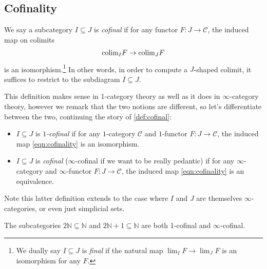 \subsection{Cofinality}
\begin{definition}\label{def:cofinal} 
We say a subcategory $I \subseteq J$ is \textit{cofinal} if for any functor $F \colon J \to \mathscr{C}$, the induced map on colimits
\begin{equation}\label{eqn:cofinality}
\begin{aligned}
    \mathrm{colim}_I F \to \mathrm{colim}_J F
\end{aligned}
\end{equation}
is an isomorphism.\footnote{%
We dually say $I \subseteq J$ is \textit{final} if the natural map $\lim_I F \to \lim_J F$ is an isomorphism for any $F$.%
}
In other words, in order to compute a $J$-shaped colimit, it suffices to restrict to the subdiagram $I \subseteq J$.
\end{definition}

\begin{remark} This definition makes sense in 1-category theory as well as it does in $\infty$-category theory, however we remark that the two notions are different, so let's differentiate between the two, continuing the story of \autoref{def:cofinal}:
\begin{itemize}
    \item $I \subseteq J$ is $1$\textit{-cofinal} if for any $1$-category $\mathscr{C}$ and $1$-functor $F \colon J \to \mathscr{C}$, the induced map \autoref{eqn:cofinality} is an isomorphism.
    \item $I \subseteq J$ is \textit{cofinal} ($\infty$-cofinal if we want to be really pedantic) if for any $\infty$-category and $\infty$-functor $F \colon J \to \mathscr{C}$, the induced map \autoref{eqn:cofinality} is an equivalence.
\end{itemize}
Note this latter definition extends to the case where $I$ and $J$ are themselves $\infty$-categories, or even just simplicial sets.
\end{remark}

\begin{example}\label{exa:even-odd-cofinal}
The subcategories $2\mathbb{N} \subseteq \mathbb{N}$ and $2 \mathbb{N} + 1 \subseteq \mathbb{N}$ are both 1-cofinal and $\infty$-cofinal. 
\end{example}


